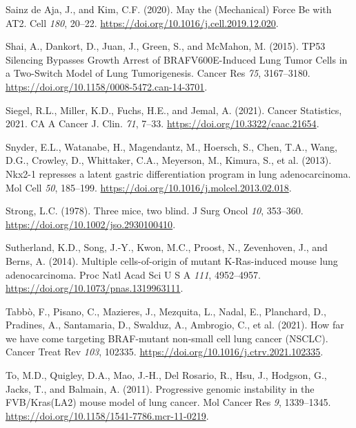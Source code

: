 \begin{CSLReferences}{0}{0}
\leavevmode{}%
Sainz de Aja, J., and Kim, C.F. (2020). May the (Mechanical) Force Be with AT2. Cell \emph{180}, 20--22. \url{https://doi.org/10.1016/j.cell.2019.12.020}.

\leavevmode{}%
Shai, A., Dankort, D., Juan, J., Green, S., and McMahon, M. (2015). TP53 Silencing Bypasses Growth Arrest of BRAFV600E-Induced Lung Tumor Cells in a Two-Switch Model of Lung Tumorigenesis. Cancer Res \emph{75}, 3167--3180. \url{https://doi.org/10.1158/0008-5472.can-14-3701}.

\leavevmode{}%
Siegel, R.L., Miller, K.D., Fuchs, H.E., and Jemal, A. (2021). Cancer Statistics, 2021. CA A Cancer J. Clin. \emph{71}, 7--33. \url{https://doi.org/10.3322/caac.21654}.

\leavevmode{}%
Snyder, E.L., Watanabe, H., Magendantz, M., Hoersch, S., Chen, T.A., Wang, D.G., Crowley, D., Whittaker, C.A., Meyerson, M., Kimura, S., et al. (2013). Nkx2-1 represses a latent gastric differentiation program in lung adenocarcinoma. Mol Cell \emph{50}, 185--199. \url{https://doi.org/10.1016/j.molcel.2013.02.018}.

\leavevmode{}%
Strong, L.C. (1978). Three mice, two blind. J Surg Oncol \emph{10}, 353--360. \url{https://doi.org/10.1002/jso.2930100410}.

\leavevmode{}%
Sutherland, K.D., Song, J.-Y., Kwon, M.C., Proost, N., Zevenhoven, J., and Berns, A. (2014). Multiple cells-of-origin of mutant K-Ras-induced mouse lung adenocarcinoma. Proc Natl Acad Sci U S A \emph{111}, 4952--4957. \url{https://doi.org/10.1073/pnas.1319963111}.

\leavevmode{}%
Tabbò, F., Pisano, C., Mazieres, J., Mezquita, L., Nadal, E., Planchard, D., Pradines, A., Santamaria, D., Swalduz, A., Ambrogio, C., et al. (2021). How far we have come targeting BRAF-mutant non-small cell lung cancer (NSCLC). Cancer Treat Rev \emph{103}, 102335. \url{https://doi.org/10.1016/j.ctrv.2021.102335}.

\leavevmode{}%
To, M.D., Quigley, D.A., Mao, J.-H., Del Rosario, R., Hsu, J., Hodgson, G., Jacks, T., and Balmain, A. (2011). Progressive genomic instability in the FVB/Kras(LA2) mouse model of lung cancer. Mol Cancer Res \emph{9}, 1339--1345. \url{https://doi.org/10.1158/1541-7786.mcr-11-0219}.


\end{CSLReferences}
